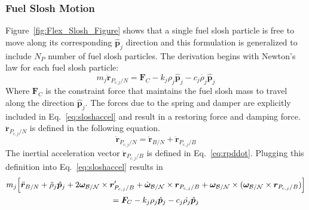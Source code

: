 \subsubsection{Fuel Slosh Motion}
Figure~\ref{fig:Flex_Slosh_Figure} shows that a single fuel slosh particle is free to move along its corresponding $\hat{\bm p}_j$ direction and this formulation is generalized to include $N_P$ number of fuel slosh particles. The derivation begins with Newton's law for each fuel slosh particle:
\begin{equation}
	m_j \ddot{\bm{r}}_{P_{c,j}/N} = \bm F_C- k_j \rho_j \hat{\bm p}_j - c_j \dot{\rho_j} \hat{\bm p}_j
	\label{eq:sloshaccel}
\end{equation}
Where $\bm F_C$ is the constraint force that maintains the fuel slosh mass to travel along the direction $\hat{\bm p}_j$. The forces due to the spring and damper are explicitly included in Eq.~\eqref{eq:sloshaccel} and result in a restoring force and damping force. $\ddot{\bm{r}}_{P_{c,j}/N}$ is defined in the following equation.
\begin{equation}
	\ddot{\bm{r}}_{P_{c,j}/N} = \ddot{\bm{r}}_{B/N} + \ddot{\bm{r}}_{P_{c,j}/B}
\end{equation}
The inertial acceleration vector $\ddot{\bm{r}}_{P_{c,j}/B}$ is defined in Eq.~\eqref{eq:rpddot}. Plugging this definition into Eq.~\eqref{eq:sloshaccel} results in
\begin{multline}
	m_j \Big[\ddot{\bm{r}}_{B/N} + \ddot{\rho}_j \hat{\bm p}_j  +2 \bm\omega_{\cal B/N} \times \bm{r}'_{P_{c,j}/B} + \dot{\bm\omega}_{\cal B/N} \times \bm{r}_{P_{c,j}/B}  +\bm\omega_{\cal B/N} \times (\bm\omega_{\cal B/N} \times \bm{r}_{P_{c,j}/B})\Big]\\
	=  \bm F_C - k_j \rho_j \hat{\bm p}_j - c_j \dot{\rho_j} \hat{\bm p}_j
	\label{eq:sloshaccel3}
\end{multline}	

